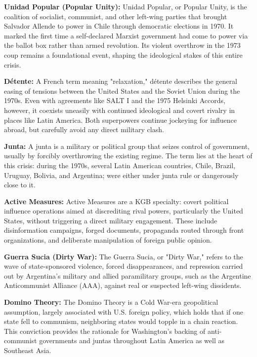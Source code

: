 \textbf{Unidad Popular (Popular Unity):} Unidad Popular, or Popular Unity, is the coalition of socialist, communist, and other left-wing parties that brought Salvador Allende to power in Chile through democratic elections in 1970. It marked the first time a self-declared Marxist government had come to power via the ballot box rather than armed revolution. Its violent overthrow in the 1973 coup remains a foundational event, shaping the ideological stakes of this entire crisis.

\textbf{Détente:} A French term meaning "relaxation," détente describes the general easing of tensions between the United States and the Soviet Union during the 1970s. Even with agreements like SALT I and the 1975 Helsinki Accords, however, it coexists uneasily with continued ideological and covert rivalry in places like Latin America. Both superpowers continue jockeying for influence abroad, but carefully avoid any direct military clash.

\textbf{Junta:} A junta is a military or political group that seizes control of government, usually by forcibly overthrowing the existing regime. The term lies at the heart of this crisis: during the 1970s, several Latin American countries, Chile, Brazil, Uruguay, Bolivia, and Argentina; were either under junta rule or dangerously close to it.

\textbf{Active Measures:} Active Measures are a KGB specialty: covert political influence operations aimed at discrediting rival powers, particularly the United States, without triggering a direct military engagement. These include disinformation campaigns, forged documents, propaganda routed through front organizations, and deliberate manipulation of foreign public opinion.

\textbf{Guerra Sucia (Dirty War):} The Guerra Sucia, or "Dirty War," refers to the wave of state-sponsored violence, forced disappearances, and repression carried out by Argentina’s military and allied paramilitary groups, such as the Argentine Anticommunist Alliance (AAA), against real or suspected left-wing dissidents.

\textbf{Domino Theory:} The Domino Theory is a Cold War-era geopolitical assumption, largely associated with U.S. foreign policy, which holds that if one state fell to communism, neighboring states would topple in a chain reaction. This conviction provides the rationale for Washington’s backing of anti-communist governments and juntas throughout Latin America as well as Southeast Asia.

